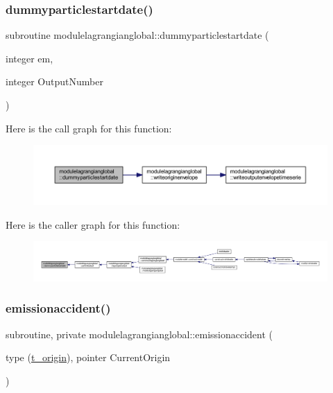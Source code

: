\subsubsection{\texorpdfstring{dummyparticlestartdate()}{dummyparticlestartdate()}}
{\footnotesize\ttfamily subroutine modulelagrangianglobal\+::dummyparticlestartdate (\begin{DoxyParamCaption}\item[{integer}]{em,  }\item[{integer}]{Output\+Number }\end{DoxyParamCaption})\hspace{0.3cm}{\ttfamily [private]}}

Here is the call graph for this function\+:\nopagebreak
\begin{figure}[H]
\begin{center}
\leavevmode
\includegraphics[width=350pt]{namespacemodulelagrangianglobal_aa302d13b1ed3a00c85939a4f07802591_cgraph}
\end{center}
\end{figure}
Here is the caller graph for this function\+:\nopagebreak
\begin{figure}[H]
\begin{center}
\leavevmode
\includegraphics[width=350pt]{namespacemodulelagrangianglobal_aa302d13b1ed3a00c85939a4f07802591_icgraph}
\end{center}
\end{figure}
\mbox{\label{namespacemodulelagrangianglobal_a8a8675b6cb7d5395b650391ce4ac3fac}} 
\subsubsection{\texorpdfstring{emissionaccident()}{emissionaccident()}}
{\footnotesize\ttfamily subroutine, private modulelagrangianglobal\+::emissionaccident (\begin{DoxyParamCaption}\item[{type (\mbox{\hyperlink{structmodulelagrangianglobal_1_1t__origin}{t\+\_\+origin}}), pointer}]{Current\+Origin }\end{DoxyParamCaption})\hspace{0.3cm}{\ttfamily [private]}}

